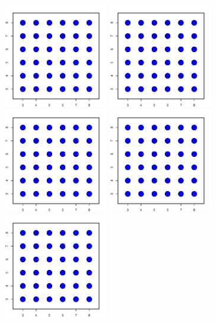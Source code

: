 \documentclass[12pt]{article}
\begin{document}
\begin{figure}
	\centering
			{\includegraphics[width=1.8in,height=1.8in]{figs/sims/simK1_sp_pies_K2.pdf}}
			{\includegraphics[width=1.8in,height=1.8in]{figs/sims/simK1_sp_pies_K3.pdf}}
			{\includegraphics[width=1.8in,height=1.8in]{figs/sims/simK1_sp_pies_K4.pdf}}
			{\includegraphics[width=1.8in,height=1.8in]{figs/sims/simK1_sp_pies_K5.pdf}}
			{\includegraphics[width=1.8in,height=1.8in]{figs/sims/simK1_sp_pies_K6.pdf}}

\end{figure}
\end{document}

